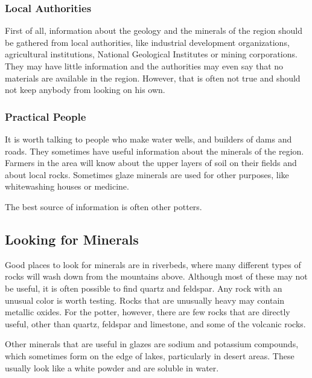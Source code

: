 \subsubsection{Local Authorities}
First of all, information about the geology and the minerals of the region 
should be gathered from local authorities, like industrial development 
organizations, agricultural institutions, National Geological Institutes or 
mining corporations. They may have little information and the authorities may 
even say that no materials are available in the region. However, that is often 
not true and should not keep anybody from looking on his own.
\subsubsection{Practical People}
It is worth talking to people who make water wells, and builders of dams and 
roads. They sometimes have useful information about the minerals of the region. 
Farmers in the area will know about the upper layers of soil on their fields 
and about local rocks. Sometimes glaze minerals are used for other purposes, 
like whitewashing houses or medicine.

The best source of information is often other potters.
\subsection{Looking for Minerals}
Good places to look for minerals are in riverbeds, where many different types 
of rocks will wash down from the mountains above. Although most of these may 
not be useful, it is often possible to find quartz and feldspar. Any rock with 
an unusual color is worth testing. Rocks that are unusually heavy may contain 
metallic oxides. For the potter, however, there are few rocks that are directly 
useful, other than quartz, feldspar and limestone, and some of the volcanic 
rocks.

Other minerals that are useful in glazes are sodium and potassium compounds, 
which sometimes form on the edge of lakes, particularly in desert areas. These 
usually look like a white powder and are soluble in water.
